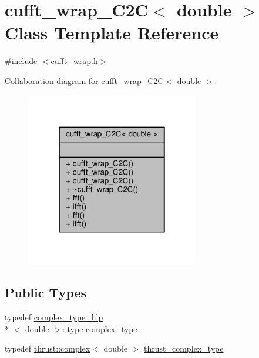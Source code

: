 \hypertarget{classcufft__wrap__C2C_3_01double_01_4}{\section{cufft\-\_\-wrap\-\_\-\-C2\-C$<$ double $>$ Class Template Reference}
\label{classcufft__wrap__C2C_3_01double_01_4}
}


{\ttfamily \#include $<$cufft\-\_\-wrap.\-h$>$}



Collaboration diagram for cufft\-\_\-wrap\-\_\-\-C2\-C$<$ double $>$\-:
\nopagebreak
\begin{figure}[H]
\begin{center}
\leavevmode
\includegraphics[width=214pt]{classcufft__wrap__C2C_3_01double_01_4__coll__graph}
\end{center}
\end{figure}
\subsection*{Public Types}
\begin{DoxyCompactItemize}
\item 
typedef \hyperlink{structcomplex__type__hlp}{complex\-\_\-type\-\_\-hlp}\\*
$<$ double $>$\-::type \hyperlink{classcufft__wrap__C2C_3_01double_01_4_a6813a47168c043bdbf7ca39cb44e16ca}{complex\-\_\-type}
\item 
typedef \hyperlink{test__deflation__typedefs_8h_a25cabcac5deb559feab415e2c445d8ba}{thrust\-::complex}$<$ double $>$ \hyperlink{classcufft__wrap__C2C_3_01double_01_4_a61adb083b7093ac3b77aea1e52f85107}{thrust\-\_\-complex\-\_\-type}
\end{DoxyCompactItemize}
